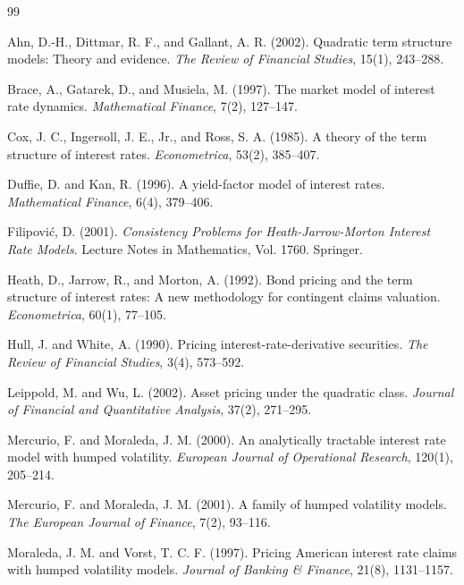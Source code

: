 \documentclass[11pt,oneside]{book}
\begin{document}
\backmatter
\renewcommand{\bibname}{References}
\begin{thebibliography}{99}

Ahn, D.-H., Dittmar, R. F., and Gallant, A. R. (2002).
Quadratic term structure models: Theory and evidence.
\emph{The Review of Financial Studies}, 15(1), 243--288.

Brace, A., Gatarek, D., and Musiela, M. (1997).
The market model of interest rate dynamics.
\emph{Mathematical Finance}, 7(2), 127--147.

Cox, J. C., Ingersoll, J. E., Jr., and Ross, S. A. (1985).
A theory of the term structure of interest rates.
\emph{Econometrica}, 53(2), 385--407.

Duffie, D. and Kan, R. (1996).
A yield-factor model of interest rates.
\emph{Mathematical Finance}, 6(4), 379--406.

Filipovi\'c, D. (2001).
\emph{Consistency Problems for Heath-Jarrow-Morton Interest Rate Models}.
Lecture Notes in Mathematics, Vol. 1760. Springer.

Heath, D., Jarrow, R., and Morton, A. (1992).
Bond pricing and the term structure of interest rates: A new methodology for contingent claims valuation.
\emph{Econometrica}, 60(1), 77--105.

Hull, J. and White, A. (1990).
Pricing interest-rate-derivative securities.
\emph{The Review of Financial Studies}, 3(4), 573--592.

Leippold, M. and Wu, L. (2002).
Asset pricing under the quadratic class.
\emph{Journal of Financial and Quantitative Analysis}, 37(2), 271--295.

Mercurio, F. and Moraleda, J. M. (2000).
An analytically tractable interest rate model with humped volatility.
\emph{European Journal of Operational Research}, 120(1), 205--214.

Mercurio, F. and Moraleda, J. M. (2001).
A family of humped volatility models.
\emph{The European Journal of Finance}, 7(2), 93--116.

Moraleda, J. M. and Vorst, T. C. F. (1997).
Pricing American interest rate claims with humped volatility models.
\emph{Journal of Banking \& Finance}, 21(8), 1131--1157.


\end{thebibliography}
\end{document}

